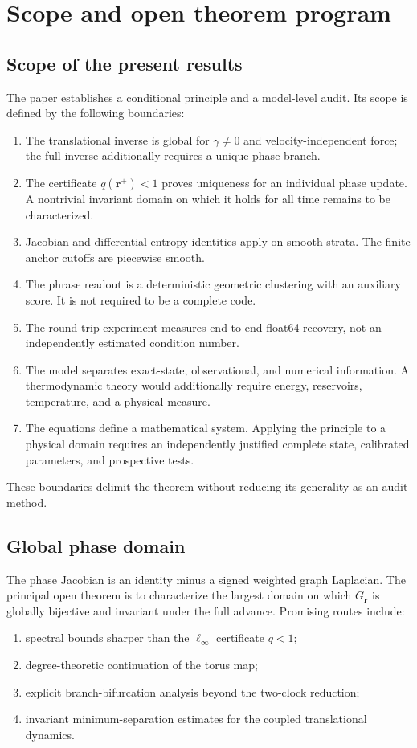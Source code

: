 \section{Scope and open theorem program}
\label{sec:scope}

\subsection{Scope of the present results}

The paper establishes a conditional principle and a model-level audit. Its scope is defined by the following boundaries:
\begin{enumerate}
\item The translational inverse is global for \(\gamma\neq0\) and velocity-independent force; the full inverse additionally requires a unique phase branch.
\item The certificate \(q(\bm r^+)<1\) proves uniqueness for an individual phase update. A nontrivial invariant domain on which it holds for all time remains to be characterized.
\item Jacobian and differential-entropy identities apply on smooth strata. The finite anchor cutoffs are piecewise smooth.
\item The phrase readout is a deterministic geometric clustering with an auxiliary score. It is not required to be a complete code.
\item The round-trip experiment measures end-to-end float64 recovery, not an independently estimated condition number.
\item The model separates exact-state, observational, and numerical information. A thermodynamic theory would additionally require energy, reservoirs, temperature, and a physical measure.
\item The equations define a mathematical system. Applying the principle to a physical domain requires an independently justified complete state, calibrated parameters, and prospective tests.
\end{enumerate}
These boundaries delimit the theorem without reducing its generality as an audit method.

\subsection{Global phase domain}

The phase Jacobian is an identity minus a signed weighted graph Laplacian. The principal open theorem is to characterize the largest domain on which \(G_{\bm r}\) is globally bijective and invariant under the full advance. Promising routes include:
\begin{enumerate}
\item spectral bounds sharper than the \(\ell_\infty\) certificate \(q<1\);
\item degree-theoretic continuation of the torus map;
\item explicit branch-bifurcation analysis beyond the two-clock reduction;
\item invariant minimum-separation estimates for the coupled translational dynamics.
\end{enumerate}

